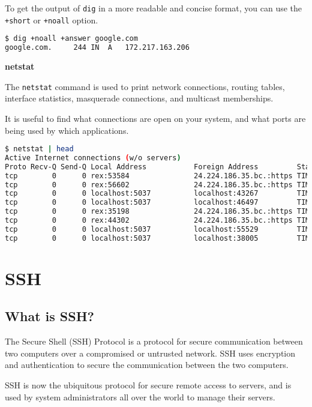 To get the output of \texttt{dig} in a more readable
and concise format, you can use the \texttt{+short}
or \texttt{+noall} option.

\begin{lstlisting}[language=bash]
$ dig +noall +answer google.com
google.com.		244	IN	A	172.217.163.206
\end{lstlisting}

\textbf{netstat}

The \texttt{netstat} command is used to print network
connections, routing tables, interface statistics,
masquerade connections, and multicast memberships.

It is useful to find what connections are open on
your system, and what ports are being used by which
applications.

\begin{lstlisting}[language=bash]
$ netstat | head
Active Internet connections (w/o servers)
Proto Recv-Q Send-Q Local Address           Foreign Address         State
tcp        0      0 rex:53584               24.224.186.35.bc.:https TIME_WAIT
tcp        0      0 rex:56602               24.224.186.35.bc.:https TIME_WAIT
tcp        0      0 localhost:5037          localhost:43267         TIME_WAIT
tcp        0      0 localhost:5037          localhost:46497         TIME_WAIT
tcp        0      0 rex:35198               24.224.186.35.bc.:https TIME_WAIT
tcp        0      0 rex:44302               24.224.186.35.bc.:https TIME_WAIT
tcp        0      0 localhost:5037          localhost:55529         TIME_WAIT
tcp        0      0 localhost:5037          localhost:38005         TIME_WAIT
\end{lstlisting}


\vfill
\pagebreak
\section{SSH}
\subsection{What is SSH?}

The Secure Shell (SSH) Protocol is a protocol for secure
communication between two computers over a compromised
or untrusted network.
SSH uses encryption and authentication to secure the
communication between the two computers.

SSH is now the ubiquitous protocol for secure remote
access to servers, and is used by system administrators
all over the world to manage their servers.

